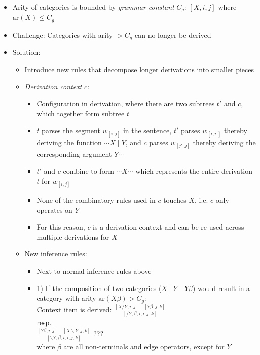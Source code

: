 \begin{itemize}
    \item Arity of categories is bounded by \emph{grammar constant} $C_g$:
    $[X, i, j]$ where $\textrm{ar}(X) \leq C_g$
    \item Challenge: Categories with arity $> C_g$ can no longer be derived
    \item Solution:
    \begin{itemize}
        \item Introduce new rules that decompose longer derivations into smaller pieces
        \item \emph{Derivation context} $c$:
        \begin{itemize}
            \item Configuration in derivation, where there are two subtrees $t'$ and $c$, which together form subtree $t$
            \item $t$ parses the segment $w_{[i,j]}$ in the sentence, $t'$ parses $w_{[i,i']}$ thereby deriving the function $\cdots X \mid Y$, and $c$ parses $w_{[j',j]}$ thereby deriving the corresponding argument $Y \cdots$
            \item $t'$ and $c$ combine to form $\cdots X \cdots$ which represents the entire derivation $t$ for $w_{[i,j]}$
            \item None of the combinatory rules used in $c$ touches $X$, i.e. $c$ only operates on $Y$
            \item For this reason, $c$ is a derivation context and can be re-used across multiple derivations for $X$ 
        \end{itemize}
        \item New inference rules:
        \begin{itemize}
            \item Next to normal inference rules above
            
            \item 1) If the composition of two categories ($X \mid Y \quad Y\beta$) would result in a category with arity $\text{ar}(X \beta) > C_g$:\\
            Context item is derived:
            $
            \frac{[X / Y, i, j] \quad [Y \beta, j, k]}{[/ Y, \beta, i, i, j, k]}
            $\\
            resp.\\
            $
            \frac{[Y \beta, i, j] \quad [X \backslash Y, j, k]}{[\backslash Y, \beta, i, i, j, k]}
            $ ??? \\
            where $\beta$ are all non-terminals and edge operators, except for $Y$


\end{itemize}
\end{itemize}
\end{itemize}
